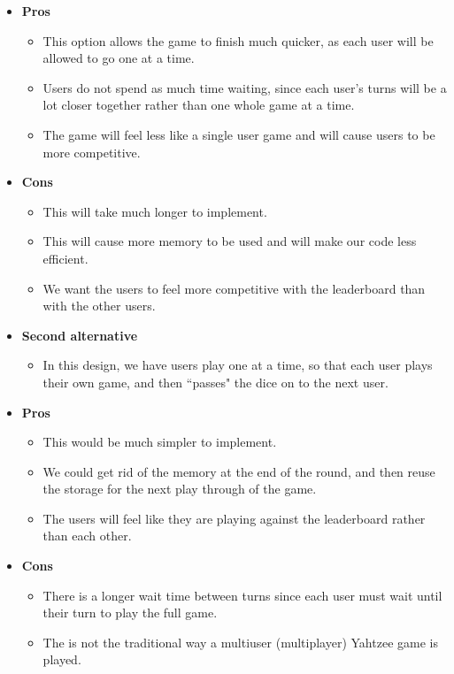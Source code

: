 \documentclass[]{report}   %
\begin{document}
\begin{itemize}
\begin{itemize}
	
	
	\item \textbf{Pros}
		\begin{itemize}
		\item This option allows the game to finish much quicker, as each user will be allowed to go one at a time. 
		\item Users do not spend as much time waiting, since each user's turns will be a lot closer together rather than one whole game at a time.
		\item The game will feel less like a single user game and will cause users to be more competitive. 
		\end{itemize}
	\item \textbf{Cons}
		\begin{itemize}
		\item This will take much longer to implement.
		\item This will cause more memory to be used and will make our code less efficient.
		\item We want the users to feel more competitive with the leaderboard than with the other users.
		\end{itemize}
	\item \textbf{Second alternative}
		\begin{itemize}
		\item In this design, we have users play one at a time, so that each user plays their own game, and then ``passes" the dice on to the next user.
		\end{itemize}
	\item \textbf{Pros}
		\begin{itemize}
		\item This would be much simpler to implement.
		\item We could get rid of the memory at the end of the round, and then reuse the storage for the next play through of the game.
		\item The users will feel like they are playing against the leaderboard rather than each other.
		\end{itemize}
	\item \textbf{Cons}
		\begin{itemize}
		\item There is a longer wait time between turns since each user must wait until their turn to play the full game.
		\item The is not the traditional way a multiuser (multiplayer) Yahtzee game is played.
		\end{itemize}
		

\end{itemize}
\end{itemize}
\end{document}

